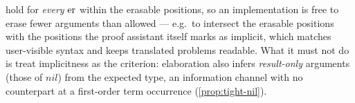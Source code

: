 \begin{remark}
  \label{rem:policy}
   hold for \emph{every}
  $\mathrm{er}$ within the erasable positions, so an implementation is free to
  erase fewer arguments than allowed --- e.g.\ to intersect the erasable
  positions with the positions the proof assistant itself marks as
  implicit, which matches user-visible syntax and keeps translated
  problems readable.  What it must not do is treat implicitness as the
  criterion: elaboration also infers \emph{result-only} arguments (those
  of $\mathit{nil}$) from the expected type, an information channel with
  no counterpart at a first-order term occurrence
  (\cref{prop:tight-nil}).
\end{remark}
